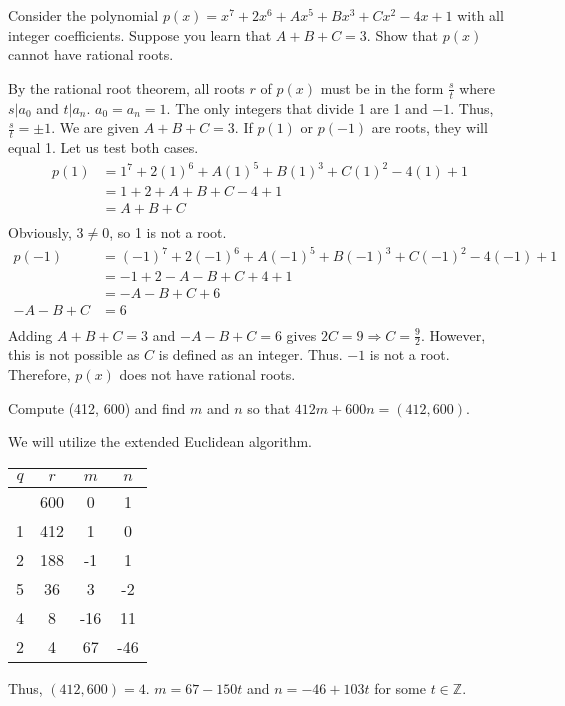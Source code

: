 \documentclass{article}
\begin{document}
\begin{problem}{}{}
    Consider the polynomial $p(x)=x^7+2x^6+Ax^5+Bx^3+Cx^2-4x+1$ with all integer coefficients. Suppose you learn that $A+B+C=3$. Show that $p(x)$ cannot have rational roots.
\end{problem}
\begin{solution}{}{}
    By the rational root theorem, all roots $r$ of $p(x)$ must be in the form $\frac{s}{t}$ where $s|a_0$ and $t|a_n$. $a_0=a_n=1$. The only integers that divide 1 are 1 and $-1$. Thus, $\frac{s}{t}=\pm 1$. We are given $A+B+C=3$. If $p(1)$ or $p(-1)$ are roots, they will equal 1. Let us test both cases.
    \begin{align*}
        p(1)&=1^7+2(1)^6+A(1)^5+B(1)^3+C(1)^2-4(1)+1 \\
        &=1+2+A+B+C-4+1 \\
        &=A+B+C \\
    \end{align*}
    Obviously, $3 \neq 0$, so 1 is not a root.
    \begin{align*}
        p(-1)&=(-1)^7+2(-1)^6+A(-1)^5+B(-1)^3+C(-1)^2-4(-1)+1 \\
        &=-1+2-A-B+C+4+1 \\
        &=-A-B+C+6 \\
        -A-B+C&=6 \\
    \end{align*}
    Adding $A+B+C=3$ and $-A-B+C=6$ gives $2C=9\Rightarrow C=\frac{9}{2}$. However, this is not possible as $C$ is defined as an integer. Thus. $-1$ is not a root. Therefore, $p(x)$ does not have rational roots.
\end{solution}

\begin{problem}{}{}
    Compute (412, 600) and find $m$ and $n$ so that $412m + 600n = (412, 600)$.
\end{problem}
\begin{solution}{}{}
    We will utilize the extended Euclidean algorithm.
    \begin{center}
        \begin{tabular}{c c c c}
        $q$ & $r$ & $m$ & $n$ \\
        \hline
        & 600 & 0 & 1 \\
        1 & 412 & 1 & 0 \\
        2 & 188 & -1 & 1 \\
        5 & 36 & 3 & -2 \\
        4 & 8 & -16 & 11 \\
        2 & 4 & 67 & -46 \\
        \end{tabular}
    \end{center}
    Thus, $(412,600)=4$. $m=67-150t$ and $n=-46+103t$ for some $t\in\mathbb{Z}$.
\end{solution}
\end{document}
